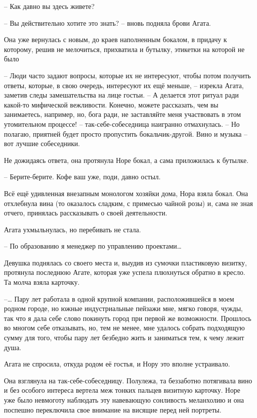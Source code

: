 \documentclass[
  a5paperpaper,
  DIV=11,
  numbers=noendperiod]{scrreprt}
\begin{document}
-- Как давно вы здесь живете?

-- Вы действительно хотите это знать? -- вновь подняла брови Агата.

Она уже вернулась с новым, до краев наполненным бокалом, в придачу к
которому, решив не мелочиться, прихватила и бутылку, этикетки на которой
не было

-- Люди часто задают вопросы, которые их не интересуют, чтобы потом
получить ответы, которые, в свою очередь, интересуют их ещё меньше, --
изрекла Агата, заметив следы замешательства на лице гостьи. -- А
делается этот ритуал ради какой-то мифической вежливости. Конечно,
можете рассказать, чем вы занимаетесь, например, но, бога ради, не
заставляйте меня участвовать в этом утомительном процессе! --
так-себе-собеседница наигранно отмахнулась. -- Но полагаю, приятней
будет просто пропустить бокальчик-другой. Вино и музыка -- вот лучшие
собеседники.

Не дожидаясь ответа, она протянула Норе бокал, а сама приложилась к
бутылке.

-- Берите-берите. Кофе ваш уже, поди, давно остыл.

Всё ещё удивленная внезапным монологом хозяйки дома, Нора взяла бокал.
Она отхлебнула вина (то оказалось сладким, с примесью чайной розы) и,
сама не зная отчего, принялась рассказывать о своей деятельности.

Агата ухмыльнулась, но перебивать не стала.

-- По образованию я менеджер по управлению проектами\ldots{}

Девушка поднялась со своего места и, выудив из сумочки пластиковую
визитку, протянула последнюю Агате, которая уже успела плюхнуться
обратно в кресло. Та молча взяла карточку.

--\ldots{} Пару лет работала в одной крупной компании, расположившейся в
моем родном городе, но южные индустриальные пейзажи мне, мягко говоря,
чужды, так что я дала себе слово покинуть город при первой же
возможности. Прошлось во многом себе отказывать, но, тем не менее, мне
удалось собрать подходящую сумму для того, чтобы пару лет безбедно жить
и заниматься тем, к чему лежит душа.

Агата не спросила, откуда родом её гостья, и Нору это вполне устраивало.

Она взглянула на так-себе-собеседницу. Полулежа, та беззаботно
потягивала вино и без особого интереса вертела меж тонких пальцев
визитную карточку. Норе уже было невмоготу наблюдать эту навевающую
сонливость меланхолию и она поспешно переключила свое внимание на
висящие перед ней портреты.
\end{document}
